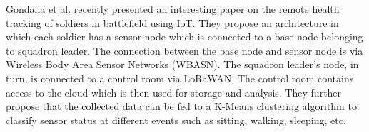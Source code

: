 \documentclass[conference]{IEEEtran}
\begin{document}
 
 
 Gondalia et al.\cite{gondalia2018iot} recently presented an interesting paper on the remote health tracking of soldiers in battlefield using IoT. They propose an architecture in which each soldier has a sensor node which is connected to a base node belonging to squadron leader. The connection between the base node and sensor node is via Wireless Body Area Sensor Networks (WBASN). The squadron leader's node, in turn, is connected to a control room via LoRaWAN. The control room contains access to the cloud which is then used for storage and analysis. They further propose that the collected data can be fed to a K-Means clustering algorithm to classify sensor status at different events such as sitting, walking, sleeping, etc.




\end{document}
